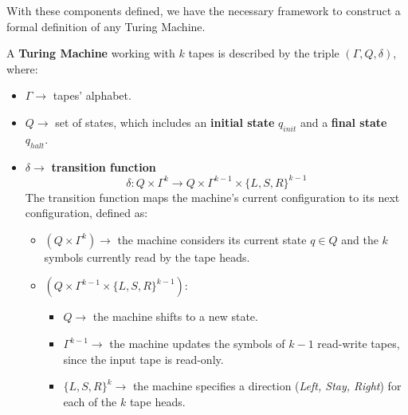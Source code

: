 With these components defined, we have the necessary framework to construct a formal definition of any Turing Machine.
\begin{definition}
    A \textbf{Turing Machine} working with $k$ tapes is described by the triple $(\Gamma,Q,\delta)$, where:
    \begin{itemize}
        \renewcommand{\labelitemi}{-}
        \item $\Gamma \rightarrow$ tapes' alphabet.
        \item $Q \rightarrow$ set of states, which includes an \textbf{initial state} $q_{init}$ and a \textbf{final state} $q_{halt}$.
        \item $\delta \rightarrow$ \textbf{transition function} $$\delta: Q \times \Gamma^k \rightarrow Q \times \Gamma^{k-1} \times \{L,S,R\}^{k-1}$$ The transition function maps the machine's current configuration to its next configuration, defined as: 
        \begin{itemize}
            \renewcommand{\labelitemi}{-} 
            \item $(Q \times \Gamma^k) \rightarrow$ the machine considers its current state $q \in Q$ and the $k$ symbols currently read by the tape heads.
            \item $(Q \times \Gamma^{k-1} \times \{L,S,R\}^{k-1})$:
            \begin{itemize}
                \item $Q \rightarrow$ the machine shifts to a new state.
                \item $\Gamma^{k-1} \rightarrow$ the machine updates the symbols of $k-1$ read-write tapes, since the input tape is read-only.
                \item $\{L, S, R\}^k \rightarrow$ the machine specifies a direction (\textit{Left, Stay, Right}) for each of the $k$ tape heads.
            \end{itemize}
        \end{itemize}
    \end{itemize}
\end{definition}